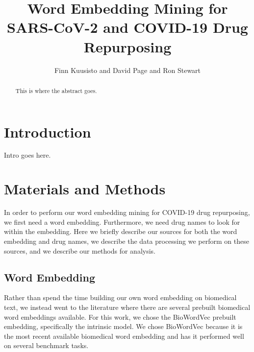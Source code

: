 \documentclass{article}
\begin{document}
\title{Word Embedding Mining for SARS-CoV-2 and COVID-19 Drug Repurposing}
\author{Finn Kuusisto and David Page and Ron Stewart}
\maketitle

\begin{abstract}

This is where the abstract goes.

\end{abstract}

\section{Introduction}

Intro goes here.

\section{Materials and Methods}

In order to perform our word embedding mining for COVID-19 drug repurposing, we first need a word embedding.
Furthermore, we need drug names to look for within the embedding.
Here we briefly describe our sources for both the word embedding and drug names, we describe the data processing we perform on these sources, and we describe our methods for analysis.

\subsection{Word Embedding}

Rather than spend the time building our own word embedding on biomedical text, we instead went to the literature where there are several prebuilt biomedical word embeddings available.
For this work, we chose the BioWordVec\cite{zhang2019biowordvec} prebuilt embedding, specifically the intrinsic model.
We chose BioWordVec because it is the most recent available biomedical word embedding and has it performed well on several benchmark tasks.
\end{document}
